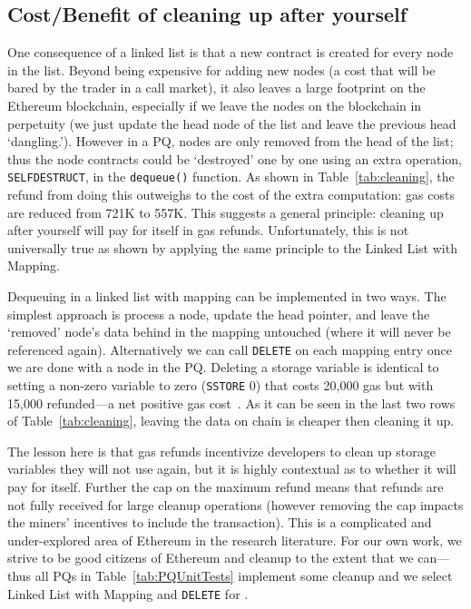 
\subsection{Cost/Benefit of cleaning up after yourself}
\label{sec:LLvsLLMapping}
\label{sec:gasrefund}



One consequence of a linked list is that a new contract is created for every node in the list. Beyond being expensive for adding new nodes (a cost that will be bared by the trader in a call market), it also leaves a large footprint on the Ethereum blockchain, especially if we leave the nodes on the blockchain in perpetuity (\ie we just update the head node of the list and leave the previous head `dangling.'). However in a PQ, nodes are only removed from the head of the list; thus the node contracts could be `destroyed' one by one using an extra operation, \texttt{SELFDESTRUCT}, in the \texttt{dequeue()} function. As shown in Table~\ref{tab:cleaning}, the refund from doing this outweighs to the cost of the extra computation: gas costs are reduced from 721K to 557K.  This suggests a general principle: cleaning up after yourself will pay for itself in gas refunds. Unfortunately, this is not universally true as shown by applying the same principle to the Linked List with Mapping. 

Dequeuing in a linked list with mapping can be implemented in two ways. The simplest approach is process a node, update the head pointer, and leave the `removed' node's data behind in the mapping untouched (where it will never be referenced again). Alternatively we can call \texttt{DELETE} on each mapping entry once we are done with a node in the PQ. Deleting a storage variable is identical to setting a non-zero variable to zero (\texttt{SSTORE} 0) that costs 20,000 gas but with 15,000 refunded---a net positive gas cost~\cite{wood2014ethereum}. As it can be seen in the last two rows of Table~\ref{tab:cleaning}, leaving the data on chain is cheaper then cleaning it up.

The lesson here is that gas refunds incentivize developers to clean up storage variables they will not use again, but it is highly contextual as to whether it will pay for itself. Further the cap on the maximum refund means that refunds are not fully received for large cleanup operations (however removing the cap impacts the miners' incentives to include the transaction). This is a complicated and under-explored area of Ethereum in the research literature. For our own work, we strive to be good citizens of Ethereum and cleanup to the extent that we can---thus all PQs in Table~\ref{tab:PQUnitTests} implement some cleanup and we select Linked List with Mapping and \texttt{DELETE} for \cm.



